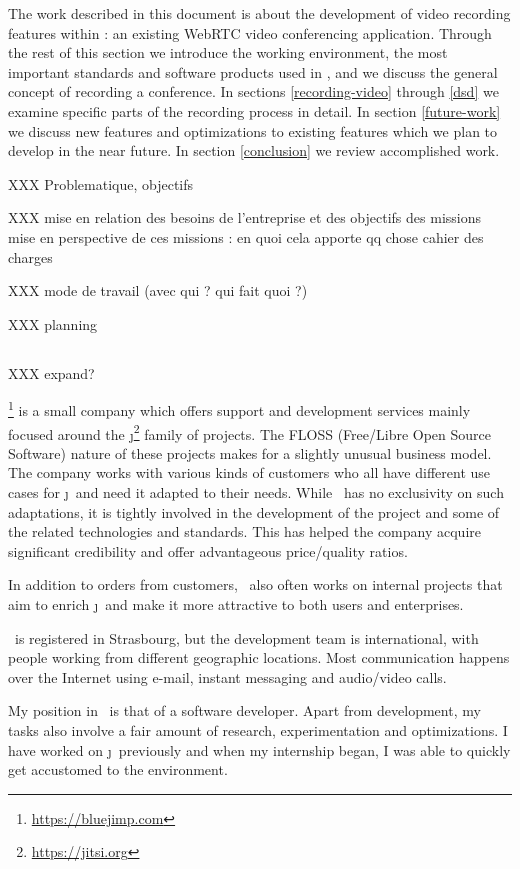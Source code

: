 \documentclass[twoside,openright,a4paper,12pt,english]{article}
\begin{document}
The work described in this document is about the development of video recording features
within \jm: an existing WebRTC video conferencing application. Through
the rest of this section we introduce the working environment, the most
important standards and software products used in \jm, and we discuss the
general concept of recording a conference. In sections \ref{recording-video} through \ref{dsd} we examine specific
parts of the recording process in detail. In section \ref{future-work} we
discuss new features and optimizations to existing features which we plan to
develop in the near future. In section \ref{conclusion} we review accomplished work.


XXX Problematique, objectifs

XXX mise en relation des besoins de l’entreprise et des objectifs des missions mise en perspective de ces missions : en quoi cela apporte qq chose cahier des charges

XXX mode de travail (avec qui ? qui fait quoi ?)

XXX planning
\subsection{\bj}
XXX expand?

\bj\footnote{\url{https://bluejimp.com}} is a small company which
offers support and development services mainly focused around the
\j\footnote{\url{https://jitsi.org}}
 family of projects. The FLOSS (Free/Libre Open Source Software)
nature of these projects makes for a slightly unusual business model. The
company works with various kinds of customers who all have different use cases
for \j\ and need it adapted to their needs. While \bj\ has no exclusivity
on such adaptations, it is tightly involved in the development of the project
and some of the related technologies and standards. This has helped the company
acquire significant credibility and offer advantageous price/quality ratios.

In addition to orders from customers, \bj\ also often works on internal projects
that aim to enrich \j\ and make it more attractive to both users and
enterprises. 

\bj\ is registered in Strasbourg, but the development team is international,
with people working from different geographic locations. Most communication happens over
the Internet using e-mail, instant messaging and audio/video calls.

My position in \bj\ is that of a software developer. Apart from development, my tasks also 
involve a fair amount of research, experimentation and optimizations. I have
worked on \j\ previously and when my internship began, I was able to quickly
get accustomed to the environment. 
\end{document}
